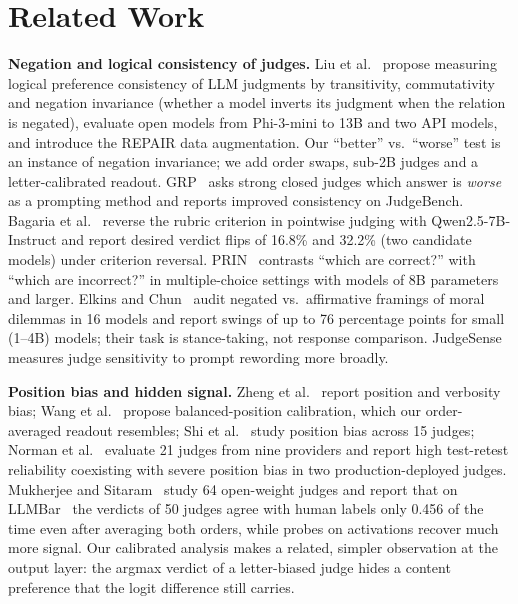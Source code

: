 \documentclass[conference]{IEEEtran}
\begin{document}
\section{Related Work}
\textbf{Negation and logical consistency of judges.} Liu et al.~\cite{liu2024aligning} propose measuring
logical preference consistency of LLM judgments by transitivity, commutativity and negation invariance (whether
a model inverts its judgment when the relation is negated), evaluate open models from Phi-3-mini to 13B and two
API models, and introduce the REPAIR data augmentation. Our ``better'' vs.\ ``worse'' test is an instance of
negation invariance; we add order swaps, sub-2B judges and a letter-calibrated readout. GRP~\cite{song2025grp}
asks strong closed judges which answer is \emph{worse} as a prompting method and reports improved consistency
on JudgeBench. Bagaria et al.~\cite{bagaria2026rubric} reverse the rubric criterion in pointwise judging with
Qwen2.5-7B-Instruct and report desired verdict flips of 16.8\% and 32.2\% (two candidate models) under criterion
reversal. PRIN~\cite{ahn2025prin} contrasts ``which are correct?'' with ``which are incorrect?'' in
multiple-choice settings with models of 8B parameters and larger. Elkins and Chun~\cite{elkins2026framing}
audit negated vs.\ affirmative framings of moral dilemmas in 16 models and report swings of up to 76
percentage points for small (1--4B) models; their task is stance-taking, not response comparison.
JudgeSense~\cite{bellibatlu2026judgesense} measures judge sensitivity to prompt rewording more broadly.

\textbf{Position bias and hidden signal.} Zheng et al.~\cite{zheng2023judging} report position and verbosity
bias; Wang et al.~\cite{wang2023fair} propose balanced-position calibration, which our order-averaged readout
resembles; Shi et al.~\cite{shi2025judging} study position bias across 15 judges; Norman et
al.~\cite{norman2026reliability} evaluate 21 judges from nine providers and report high test-retest
reliability coexisting with severe position bias in two production-deployed judges. Mukherjee and Sitaram~\cite{mukherjee2026opening} study 64
open-weight judges and report that on LLMBar~\cite{zeng2024llmbar} the verdicts of 50 judges agree with human
labels only 0.456 of the time even after averaging both orders, while probes on activations recover much more
signal. Our calibrated analysis makes a related, simpler observation at the output layer: the argmax verdict of
a letter-biased judge hides a content preference that the logit difference still carries.
\end{document}
